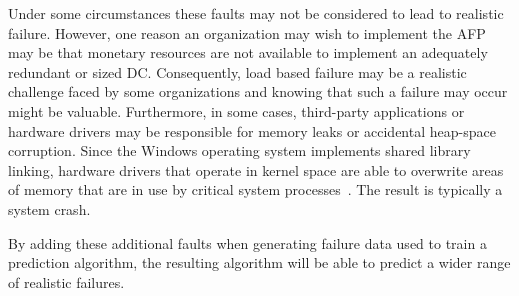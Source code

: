 Under some circumstances these faults may not be considered to lead to
realistic failure.  However, one reason an organization may wish to implement
the \ac{AFP} may be that monetary resources are not available to implement an
adequately redundant or sized \ac{DC}.  Consequently, load based failure may be a
realistic challenge faced by some organizations and knowing that such a failure
may occur might be valuable.  Furthermore, in some cases, third-party
applications or hardware drivers may be responsible for memory leaks or
accidental heap-space corruption.  Since the Windows operating system
implements shared library linking, hardware drivers that operate in kernel
space are able to overwrite areas of memory that are in use by critical system
processes~\cite{russinovich2009}.  The result is typically a system crash.

By adding these additional faults when generating failure data used to train a
prediction algorithm, the resulting algorithm will be able to predict a wider
range of realistic failures.  
